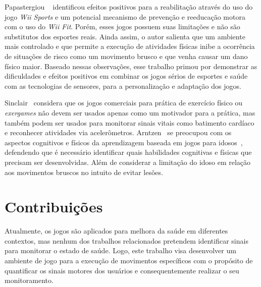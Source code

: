 
Papastergiou ~\cite{Papastergiou:2009:EPC:1570538.1570707} identificou efeitos positivos para a reabilitação através do uso do jogo \textit{Wii Sports} e um potencial mecanismo de prevenção e reeducação motora com o uso do \textit{Wii Fit}. Porém, esses jogos possuem suas limitações e não são substitutos dos esportes reais. Ainda assim, o autor salienta que um ambiente mais controlado e que permite a execução de atividades físicas inibe a ocorrência de situações de risco como um movimento brusco e que venha causar um dano físico maior. Baseado nessas observações, esse trabalho primou por demonstrar as dificuldades e efeitos positivos em combinar os jogos sérios de esportes e saúde com as tecnologias de sensores, para a personalização e adaptação dos jogos.

Sinclair~\cite{Sinclair:2009:UVB:1515604.1515617} considera que os jogos comerciais para prática de exercício físico ou \textit{exergames} não devem ser usados apenas como um motivador para a prática, mas também podem ser usados para monitorar sinais vitais como batimento cardíaco e reconhecer atividades via acelerômetros. Arntzen~\cite{arntzen2011} se preocupou com os aspectos cognitivos e físicos da aprendizagem baseada em jogos para idosos~\cite{arntzen2011}, defendendo que é necessário identificar quais habilidades cognitivas e físicas que precisam ser desenvolvidas. Além de considerar a limitação do idoso em relação aos movimentos bruscos no intuito de evitar lesões.




\section{Contribuições}
Atualmente, os jogos são aplicados para melhora da saúde em diferentes contextos, mas nenhum dos trabalhos relacionados pretendem identificar sinais para monitorar o estado de saúde. Logo, este trabalho visa desenvolver um ambiente de jogo para a execução de movimentos específicos com o propósito de quantificar os sinais motores dos usuários e consequentemente realizar o seu monitoramento.

